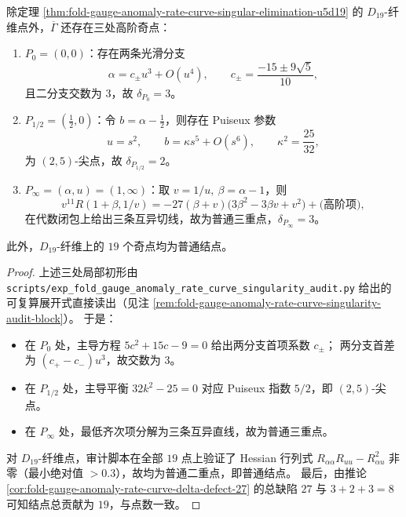 \begin{proposition}\label{prop:fold-gauge-anomaly-rate-curve-three-special-singularities}
除定理 \ref{thm:fold-gauge-anomaly-rate-curve-singular-elimination-u5d19} 的 \(D_{19}\)-纤维点外，\(\overline\Gamma\) 还存在三处高阶奇点：
\begin{enumerate}
  \item \(P_0=(0,0)\)：存在两条光滑分支
  \[
  \alpha=c_{\pm}u^3+O(u^4),\qquad
  c_{\pm}=\frac{-15\pm 9\sqrt5}{10},
  \]
  且二分支交数为 \(3\)，故 \(\delta_{P_0}=3\)。
  \item \(P_{1/2}=(\frac12,0)\)：令 \(b=\alpha-\frac12\)，则存在 Puiseux 参数
  \[
  u=s^2,\qquad b=\kappa s^5+O(s^6),\qquad \kappa^2=\frac{25}{32},
  \]
  为 \((2,5)\)-尖点，故 \(\delta_{P_{1/2}}=2\)。
  \item \(P_{\infty}=(\alpha,u)=(1,\infty)\)：取 \(v=1/u,\ \beta=\alpha-1\)，则
  \[
  v^{11}R(1+\beta,1/v)
  =-27(\beta+v)\bigl(3\beta^2-3\beta v+v^2\bigr)+\text{(高阶项)},
  \]
  在代数闭包上给出三条互异切线，故为普通三重点，\(\delta_{P_{\infty}}=3\)。
\end{enumerate}
此外，\(D_{19}\)-纤维上的 \(19\) 个奇点均为普通结点。
\end{proposition}

\begin{proof}
上述三处局部初形由
\texttt{scripts/exp\_fold\_gauge\_anomaly\_rate\_curve\_singularity\_audit.py}
给出的可复算展开式直接读出（见注 \ref{rem:fold-gauge-anomaly-rate-curve-singularity-audit-block}）。
于是：
\begin{itemize}
  \item 在 \(P_0\) 处，主导方程 \(5c^2+15c-9=0\) 给出两分支首项系数 \(c_{\pm}\)；
  两分支首差为 \((c_+-c_-)u^3\)，故交数为 \(3\)。
  \item 在 \(P_{1/2}\) 处，主导平衡 \(32k^2-25=0\) 对应 Puiseux 指数 \(5/2\)，即 \((2,5)\)-尖点。
  \item 在 \(P_{\infty}\) 处，最低齐次项分解为三条互异直线，故为普通三重点。
\end{itemize}
对 \(D_{19}\)-纤维点，审计脚本在全部 \(19\) 点上验证了 Hessian 行列式
\(
R_{\alpha\alpha}R_{uu}-R_{\alpha u}^2
\)
非零（最小绝对值 \(>0.3\)），故均为普通二重点，即普通结点。
最后，由推论 \ref{cor:fold-gauge-anomaly-rate-curve-delta-defect-27} 的总缺陷 \(27\) 与
\(
3+2+3=8
\)
可知结点总贡献为 \(19\)，与点数一致。
\end{proof}

